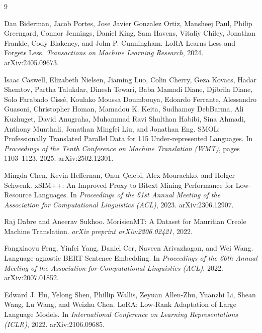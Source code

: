\documentclass[11pt]{article}
\begin{document}
\begin{thebibliography}{9}
\small

Dan Biderman, Jacob Portes, Jose Javier Gonzalez Ortiz, Mansheej Paul, Philip Greengard, Connor
Jennings, Daniel King, Sam Havens, Vitaliy Chiley, Jonathan Frankle, Cody Blakeney, and John P.
Cunningham.
\newblock LoRA Learns Less and Forgets Less.
\newblock \emph{Transactions on Machine Learning Research}, 2024. arXiv:2405.09673.

Isaac Caswell, Elizabeth Nielsen, Jiaming Luo, Colin Cherry, Geza Kovacs, Hadar Shemtov, Partha
Talukdar, Dinesh Tewari, Baba Mamadi Diane, Djibrila Diane, Solo Farabado Cissé, Koulako Moussa
Doumbouya, Edoardo Ferrante, Alessandro Guasoni, Christopher Homan, Mamadou K. Keita, Sudhamoy
DebBarma, Ali Kuzhuget, David Anugraha, Muhammad Ravi Shulthan Habibi, Sina Ahmadi, Anthony Munthali,
Jonathan Mingfei Liu, and Jonathan Eng.
\newblock SMOL: Professionally Translated Parallel Data for 115 Under-represented Languages.
\newblock In \emph{Proceedings of the Tenth Conference on Machine Translation (WMT)}, pages
1103--1123, 2025. arXiv:2502.12301.

Mingda Chen, Kevin Heffernan, Onur Çelebi, Alex Mourachko, and Holger Schwenk.
\newblock xSIM++: An Improved Proxy to Bitext Mining Performance for Low-Resource Languages.
\newblock In \emph{Proceedings of the 61st Annual Meeting of the Association for Computational
Linguistics (ACL)}, 2023. arXiv:2306.12907.

Raj Dabre and Aneerav Sukhoo.
\newblock MorisienMT: A Dataset for Mauritian Creole Machine Translation.
\newblock \emph{arXiv preprint arXiv:2206.02421}, 2022.

Fangxiaoyu Feng, Yinfei Yang, Daniel Cer, Naveen Arivazhagan, and Wei Wang.
\newblock Language-agnostic BERT Sentence Embedding.
\newblock In \emph{Proceedings of the 60th Annual Meeting of the Association for Computational
Linguistics (ACL)}, 2022. arXiv:2007.01852.

Edward J. Hu, Yelong Shen, Phillip Wallis, Zeyuan Allen-Zhu, Yuanzhi Li, Shean Wang, Lu Wang, and
Weizhu Chen.
\newblock LoRA: Low-Rank Adaptation of Large Language Models.
\newblock In \emph{International Conference on Learning Representations (ICLR)}, 2022.
arXiv:2106.09685.


\end{thebibliography}
\end{document}
